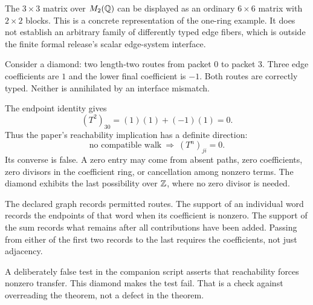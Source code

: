 The $3\times3$ matrix over $M_2(\mathbb Q)$ can be displayed as an ordinary $6\times6$ matrix with $2\times2$ blocks. This is a concrete representation of the one-ring example. It does not establish an arbitrary family of differently typed edge fibers, which is outside the finite formal release's scalar edge-system interface.


Consider a diamond: two length-two routes from packet $0$ to packet $3$. Three edge coefficients are $1$ and the lower final coefficient is $-1$. Both routes are correctly typed. Neither is annihilated by an interface mismatch.


The endpoint identity gives
\[
(T^2)_{30}=(1)(1)+(-1)(1)=0.
\]
Thus the paper's reachability implication has a definite direction:
\[
\text{no compatible walk}\ \Longrightarrow\ (T^n)_{ji}=0.
\]
Its converse is false. A zero entry may come from absent paths, zero coefficients, zero divisors in the coefficient ring, or cancellation among nonzero terms. The diamond exhibits the last possibility over $\mathbb Z$, where no zero divisor is needed.

The declared graph records permitted routes. The support of an individual word records the endpoints of that word when its coefficient is nonzero. The support of the sum records what remains after all contributions have been added. Passing from either of the first two records to the last requires the coefficients, not just adjacency.

A deliberately false test in the companion script asserts that reachability forces nonzero transfer. This diamond makes the test fail. That is a check against overreading the theorem, not a defect in the theorem.


